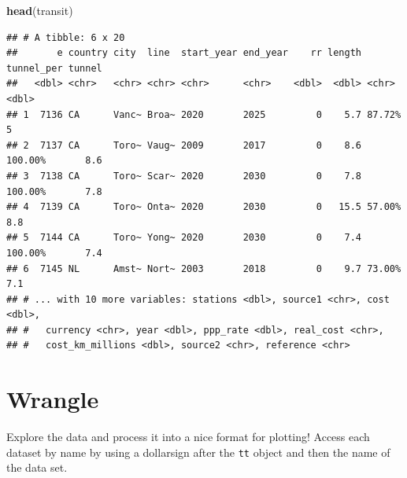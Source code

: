 \documentclass[]{article}
\newenvironment{Shaded}{\begin{snugshade}}{\end{snugshade}}
\newcommand{\CommentTok}[1]{\textcolor[rgb]{0.56,0.35,0.01}{\textit{#1}}}
\newcommand{\DataTypeTok}[1]{\textcolor[rgb]{0.13,0.29,0.53}{#1}}
\newcommand{\KeywordTok}[1]{\textcolor[rgb]{0.13,0.29,0.53}{\textbf{#1}}}
\newcommand{\NormalTok}[1]{#1}
\newcommand{\OperatorTok}[1]{\textcolor[rgb]{0.81,0.36,0.00}{\textbf{#1}}}
\newcommand{\StringTok}[1]{\textcolor[rgb]{0.31,0.60,0.02}{#1}}
\begin{document}
\begin{Shaded}
\begin{Highlighting}[]
\KeywordTok{head}\NormalTok{(transit)}
\end{Highlighting}
\end{Shaded}

\begin{verbatim}
## # A tibble: 6 x 20
##       e country city  line  start_year end_year    rr length tunnel_per tunnel
##   <dbl> <chr>   <chr> <chr> <chr>      <chr>    <dbl>  <dbl> <chr>       <dbl>
## 1  7136 CA      Vanc~ Broa~ 2020       2025         0    5.7 87.72%        5  
## 2  7137 CA      Toro~ Vaug~ 2009       2017         0    8.6 100.00%       8.6
## 3  7138 CA      Toro~ Scar~ 2020       2030         0    7.8 100.00%       7.8
## 4  7139 CA      Toro~ Onta~ 2020       2030         0   15.5 57.00%        8.8
## 5  7144 CA      Toro~ Yong~ 2020       2030         0    7.4 100.00%       7.4
## 6  7145 NL      Amst~ Nort~ 2003       2018         0    9.7 73.00%        7.1
## # ... with 10 more variables: stations <dbl>, source1 <chr>, cost <dbl>,
## #   currency <chr>, year <dbl>, ppp_rate <dbl>, real_cost <chr>,
## #   cost_km_millions <dbl>, source2 <chr>, reference <chr>
\end{verbatim}

\hypertarget{wrangle}{%
\section{Wrangle}\label{wrangle}}

Explore the data and process it into a nice format for plotting! Access
each dataset by name by using a dollarsign after the \texttt{tt} object
and then the name of the data set.

\begin{Shaded}
\end{Shaded}
\end{document}
